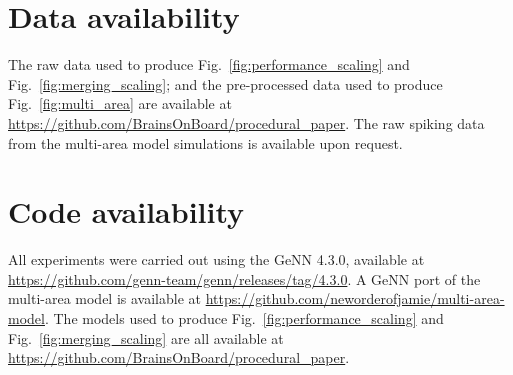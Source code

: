 \documentclass[9pt,a4paper]{amsart}
\begin{document}
\section{Data availability}
The raw data used to produce Fig.~\ref{fig:performance_scaling} and Fig.~\ref{fig:merging_scaling}; and the pre-processed data used to produce Fig.~\ref{fig:multi_area} are available at \url{https://github.com/BrainsOnBoard/procedural_paper}.
The raw spiking data from the multi-area model simulations is available upon request.

\section{Code availability}
All experiments were carried out using the GeNN 4.3.0, available at \url{https://github.com/genn-team/genn/releases/tag/4.3.0}.
A GeNN port of the multi-area model is available at \url{https://github.com/neworderofjamie/multi-area-model}.
The models used to produce Fig.~\ref{fig:performance_scaling} and Fig.~\ref{fig:merging_scaling} are all available at \url{https://github.com/BrainsOnBoard/procedural_paper}.



\end{document}
